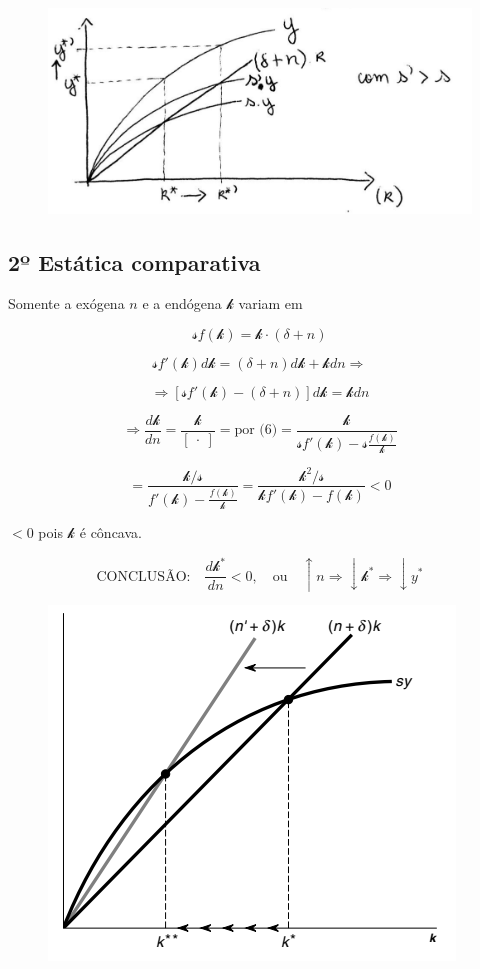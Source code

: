 \documentclass[a4paper,12pt]{article}[abntex2]
\begin{document}
\begin{figure}[H]
    \centering
    \includegraphics[width=0.7\linewidth]{Imagens/a7i1.png}
\end{figure}

\subsection{\textbf{2º Estática comparativa}}
Somente a exógena \( n \) e a endógena \( \mathcal{k} \) variam em

\[
\mathcal{s} f(\mathcal{k}) = \mathcal{k} \cdot (\delta + n) \tag{6}
\]

\[
\mathcal{s} f'(\mathcal{k}) d\mathcal{k} = (\delta + n) d\mathcal{k} + \mathcal{k} dn \Rightarrow
\]

\[
\Rightarrow \left[\mathcal{s} f'(\mathcal{k}) - (\delta + n)\right] d\mathcal{k} = \mathcal{k} dn
\]

\[
\Rightarrow \frac{d\mathcal{k}}{dn} = \frac{\mathcal{k}}{[\ \cdot \ ]} = \text{por (6)} = \frac{\mathcal{k}}{\mathcal{s} f'(\mathcal{k}) - \mathcal{s} \frac{f(\mathcal{k})}{\mathcal{k}}}
\]

\[
= \frac{\mathcal{k}/\mathcal{s}}{f'(\mathcal{k}) - \frac{f(\mathcal{k})}{\mathcal{k}}} = \frac{\mathcal{k}^2 / \mathcal{s}}{\mathcal{k} f'(\mathcal{k}) - f(\mathcal{k})} < 0
\]

\(< 0\) pois \( \mathcal{k} \) é côncava.

\[
\text{CONCLUSÃO:} \quad \frac{d\mathcal{k}^*}{dn} < 0, \quad \text{ou} \quad \uparrow n \Rightarrow \downarrow \mathcal{k}^* \Rightarrow \downarrow y^*
\]

\begin{figure}[H]
    \centering
    \includegraphics[width=0.7\linewidth]{Imagens/a7i2.png}
\end{figure}
\end{document}
